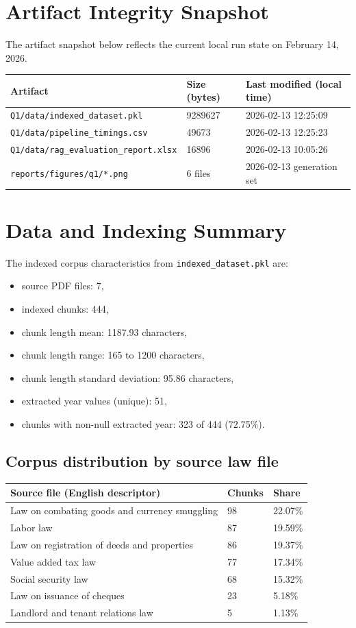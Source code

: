 \documentclass[12pt,a4paper]{article}
\begin{document}
\section{Artifact Integrity Snapshot}
The artifact snapshot below reflects the current local run state on February 14, 2026.
\begin{longtable}{@{}p{} p{} p{}@{}}
\toprule
Artifact & Size (bytes) & Last modified (local time) \\
\midrule
\texttt{Q1/data/indexed\_dataset.pkl} & 9289627 & 2026-02-13 12:25:09 \\
\texttt{Q1/data/pipeline\_timings.csv} & 49673 & 2026-02-13 12:25:23 \\
\texttt{Q1/data/}\linebreak\texttt{rag\_evaluation\_report.xlsx} & 16896 & 2026-02-13 10:05:26 \\
\texttt{reports/figures/q1/*.png} & 6 files & 2026-02-13 generation set \\
\bottomrule
\end{longtable}

\section{Data and Indexing Summary}
The indexed corpus characteristics from \texttt{indexed\_dataset.pkl} are:
\begin{itemize}
\item source PDF files: 7,
\item indexed chunks: 444,
\item chunk length mean: 1187.93 characters,
\item chunk length range: 165 to 1200 characters,
\item chunk length standard deviation: 95.86 characters,
\item extracted year values (unique): 51,
\item chunks with non-null extracted year: 323 of 444 (72.75\%).
\end{itemize}

\subsection*{Corpus distribution by source law file}
\begin{longtable}{@{}p{} p{} p{}@{}}
\toprule
Source file (English descriptor) & Chunks & Share \\
\midrule
Law on combating goods and currency smuggling & 98 & 22.07\% \\
Labor law & 87 & 19.59\% \\
Law on registration of deeds and properties & 86 & 19.37\% \\
Value added tax law & 77 & 17.34\% \\
Social security law & 68 & 15.32\% \\
Law on issuance of cheques & 23 & 5.18\% \\
Landlord and tenant relations law & 5 & 1.13\% \\
\bottomrule
\end{longtable}
\end{document}
